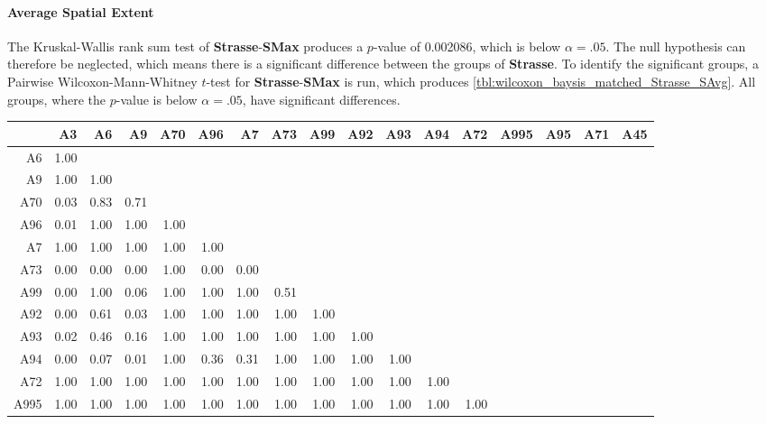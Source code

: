 \paragraph{Average Spatial Extent}
The Kruskal-Wallis rank sum test of \textbf{Strasse}-\textbf{SMax} produces a $p$-value of 0.002086, which is below $\alpha=.05$. The null hypothesis can therefore be neglected, which means there is a significant difference between the groups of \textbf{Strasse}. To identify the significant groups, a Pairwise Wilcoxon-Mann-Whitney $t$-test for \textbf{Strasse}-\textbf{SMax} is run, which produces \autoref{tbl:wilcoxon_baysis_matched_Strasse_SAvg}. All groups, where the $p$-value is below $\alpha=.05$, have significant differences. 
\begin{table}[ht]
	\tiny
	\setlength{\tabcolsep}{4pt}
	\centering
	\begin{tabular}{rrrrrrrrrrrrrrrrr}
		\toprule
	 	& A3 & A6 & A9 & A70 & A96 & A7 & A73 & A99 & A92 & A93 & A94 & A72 & A995 & A95 & A71 & A45 \\ 
		\midrule
		A6 & 1.00 &  &  &  &  &  &  &  &  &  &  &  &  &  &  &  \\ 
	  	A9 & 1.00 & 1.00 &  &  &  &  &  &  &  &  &  &  &  &  &  &  \\ 
	  	A70 & 0.03 & 0.83 & 0.71 &  &  &  &  &  &  &  &  &  &  &  &  &  \\ 
	  	A96 & 0.01 & 1.00 & 1.00 & 1.00 &  &  &  &  &  &  &  &  &  &  &  &  \\ 
	  	A7 & 1.00 & 1.00 & 1.00 & 1.00 & 1.00 &  &  &  &  &  &  &  &  &  &  &  \\ 
	  	A73 & 0.00 & 0.00 & 0.00 & 1.00 & 0.00 & 0.00 &  &  &  &  &  &  &  &  &  &  \\ 
	  	A99 & 0.00 & 1.00 & 0.06 & 1.00 & 1.00 & 1.00 & 0.51 &  &  &  &  &  &  &  &  &  \\ 
	  	A92 & 0.00 & 0.61 & 0.03 & 1.00 & 1.00 & 1.00 & 1.00 & 1.00 &  &  &  &  &  &  &  &  \\ 
	  	A93 & 0.02 & 0.46 & 0.16 & 1.00 & 1.00 & 1.00 & 1.00 & 1.00 & 1.00 &  &  &  &  &  &  &  \\ 
	  	A94 & 0.00 & 0.07 & 0.01 & 1.00 & 0.36 & 0.31 & 1.00 & 1.00 & 1.00 & 1.00 &  &  &  &  &  &  \\ 
	  	A72 & 1.00 & 1.00 & 1.00 & 1.00 & 1.00 & 1.00 & 1.00 & 1.00 & 1.00 & 1.00 & 1.00 &  &  &  &  &  \\ 
	  	A995 & 1.00 & 1.00 & 1.00 & 1.00 & 1.00 & 1.00 & 1.00 & 1.00 & 1.00 & 1.00 & 1.00 & 1.00 &  &  &  &  \\ 

\end{tabular}
\end{table}
